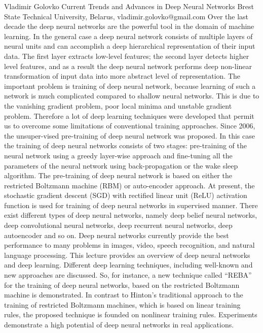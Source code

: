 \documentclass[10pt,fleqn,openany]{book} %
\begin{document}
\begin{enumerate}
	\paperabstract
		{Vladimir Golovko}
		{Current Trends and Advances in Deep Neural Networks}
		{Brest State Technical University, Belarus, vladimir.golovko@gmail.com}
		{
			Over the last decade the deep neural networks are the powerful tool in the domain of machine learning. In the general case a deep neural network consists of multiple layers of neural units and can accomplish a deep hierarchical representation of their input data. The first layer extracts low-level features; the second layer detects higher level features, and as a result the deep neural network performs deep non-linear transformation of input data into more abstract level of representation. The important problem is training of deep neural network, because learning of such a network is much complicated compared to shallow neural networks. This is due to the vanishing gradient problem, poor local minima and unstable gradient problem. Therefore a lot of deep learning techniques were developed that permit us to overcome some limitations of conventional training approaches. Since 2006, the unsuper-vised pre-training of deep neural network was proposed. In this case the training of deep neural networks consists of two stages: pre-training of the neural network using a greedy layer-wise approach and fine-tuning all the parameters of the neural network using back-propagation or the wake sleep algorithm. The pre-training of deep neural network is based on either the restricted Boltzmann machine (RBM) or auto-encoder approach. At present, the stochastic gradient descent (SGD) with rectified linear unit (ReLU) activation function is used for training of deep neural networks in supervised manner. There exist different types of deep neural networks, namely deep belief neural networks, deep convolutional neural networks, deep recurrent neural networks, deep autoencoder and so on. Deep neural networks currently provide the best performance to many problems in images, video, speech recognition, and natural language processing. This lecture provides an overview of deep neural networks and deep learning. Different deep learning techniques, including well-known and new approaches are discussed. So, for instance, a new technique called “REBA” for the training of deep neural networks, based on the restricted Boltzmann machine is demonstrated. In contrast to Hinton’s traditional approach to the training of restricted Boltzmann machines, which is based on linear training rules, the proposed technique is founded on nonlinear training rules. Experiments demonstrate a high potential of deep neural networks in real applications.}
		

\end{enumerate}
\end{document}
